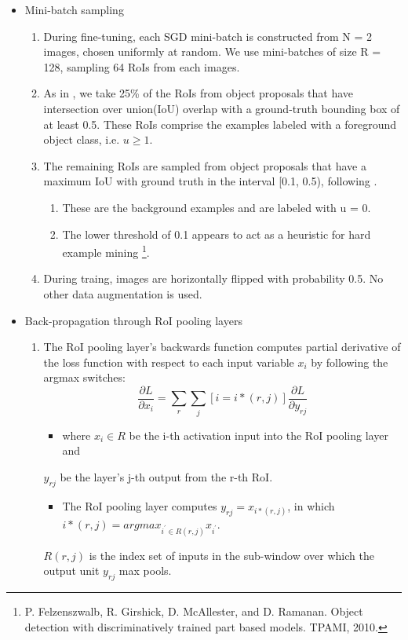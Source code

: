 \documentclass[11pt]{article}
\begin{document}
\begin{itemize}
\item Mini-batch sampling\\
\label{sec-1-1-3-2}%
\begin{enumerate}
\item During fine-tuning, each SGD mini-batch is constructed from N = 2 images, chosen uniformly
        at random. We use mini-batches of size R = 128, sampling 64 RoIs from each images.
\item As in \footnotemark[1], we take 25\% of the RoIs from object proposals that have intersection over
        union(IoU) overlap with a ground-truth bounding box of at least 0.5. These RoIs comprise
        the examples labeled with a foreground object class, i.e. $u \ge 1$.
\item The remaining RoIs are sampled from object proposals that have a maximum IoU with ground truth
        in the interval [0.1, 0.5), following \footnotemark[4].
\begin{enumerate}
\item These are the background examples and are labeled with u = 0.
\item The lower threshold of 0.1 appears to act as a heuristic for hard example mining \footnote{P.  Felzenszwalb,  R.  Girshick,  D.  McAllester,  and  D.  Ramanan.   
Object detection with discriminatively trained part based models.
TPAMI, 2010.
 }.
\end{enumerate}
\item During traing, images are horizontally flipped with probability 0.5. No other data 
        augmentation is used.
\end{enumerate}


\item Back-propagation through RoI pooling layers\\
\label{sec-1-1-3-3}%
\begin{enumerate}
\item The RoI pooling layer's backwards function computes partial derivative of the loss
        function with respect to each input variable $x_i$ by following the argmax switches:
        \begin{equation}
          \frac{\partial{L}}{\partial{x_i}} = \sum_r\sum_j[i = i*(r,j)]\frac{\partial{L}}{\partial{y_{rj}}}
        \end{equation}
\begin{itemize}
\item where $x_i\in{R}$ be the i-th activation input into the RoI pooling layer and
\end{itemize}
$y_{rj}$ be the layer's j-th output from the r-th RoI.
\begin{itemize}
\item The RoI pooling layer computes $y_{rj}=x_{i*(r,j)}$, in which $i*(r,j)=argmax_{i^{'}\in{R(r,j)}}x_{i^{'}}$.
\end{itemize}
$R(r,j)$ is the index set of inputs in the sub-window over which the output unit $y_{rj}$ 
        max pools.
\end{enumerate}



\end{itemize}
\end{document}
